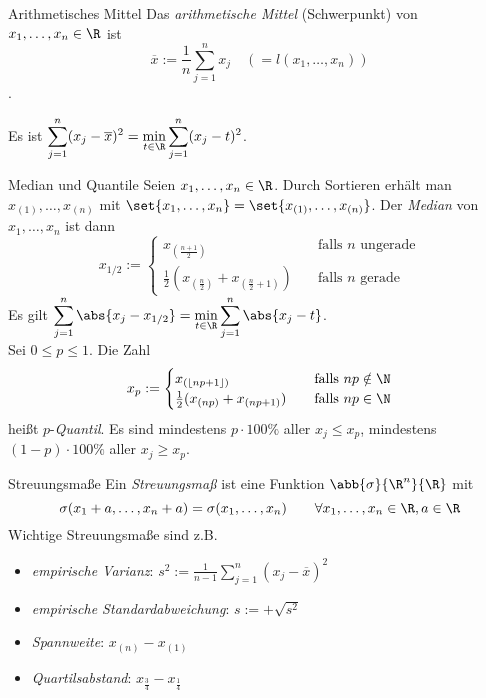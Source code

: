 \begin{karte}{Arithmetisches Mittel}
	Das \textit{arithmetische Mittel} (Schwerpunkt) von $x_1,\dotsc,x_n \in \R$ ist \[ \overline{x} := \frac{1}{n}\sum_{j=1}^{n} x_j \quad (= l(x_1,\dotsc,x_n))\].
	
	Es ist $\displaystyle \sum_{j=1}^{n} (x_j-\overline{x})^2 = 
	\min_{t \in \R} \sum_{j=1}^{n} (x_j-t)^2$.
\end{karte}
\begin{karte}{Median und Quantile}
	Seien $x_1,\dotsc,x_n \in \R$. Durch Sortieren erhält man $ x_{(1)},\dotsc,x_{(n)}$ mit $\set{x_1,\dotsc,x_n} = \set{x_{(1)},\dotsc,x_{(n)}}$. Der \textit{Median} von $x_1,\dotsc,x_n$ ist dann
	\[x_{1/2}:= \begin{cases}
	x_{(\frac{n+1}{2})} & \quad \text{falls } n \text{ ungerade} \\
	\frac{1}{2}(x_{(\frac{n}{2})}+x_{(\frac{n}{2}+1)}) & \quad \text{falls } n \text{ gerade}
	\end{cases}\]
	Es gilt $\displaystyle \sum_{j=1}^{n} \abs{x_j - x_{1/2}} = \min_{t \in \R} \sum_{j=1}^{n} \abs{x_j-t}$. \\
	Sei $0 \le p \le 1$. Die Zahl
	\[x_p:= \begin{cases}
	x_{(\lfloor np+1 \rfloor)} & \quad \text{falls } np \notin \N \\
	\frac{1}{2}(x_{(np)}+x_{(np+1)}) & \quad \text{falls } np \in \N
	\end{cases}\] heißt $p$-\textit{Quantil}. Es sind mindestens $p\cdot 100 \% $ aller $x_j \leq x_p$, mindestens $(1-p)\cdot 100 \%$ aller $x_j \geq x_p$.
\end{karte}

\begin{karte}{Streuungsmaße}
	Ein \textit{Streuungsmaß} ist eine Funktion $\abb{\sigma}{\R^n}{\R}$ mit \[\sigma(x_1+a,\dotsc,x_n+a) = \sigma(x_1,\dotsc,x_n) \qquad \forall x_1,\dotsc,x_n \in \R, a \in \R\]
	Wichtige Streuungsmaße sind z.B.
	\begin{itemize}
		\item \textit{empirische Varianz}: $\displaystyle s^2:=\frac{1}{n-1} \sum_{j=1}^{n} (x_j-\overline{x})^2$
		\item \textit{empirische Standardabweichung}: $s :=+\sqrt{s^2}$
		\item \textit{Spannweite}: $x_{(n)}-x_{(1)}$
		\item \textit{Quartilsabstand}: $x_{\frac{3}{4}}-x_{\frac{1}{4}}$
	\end{itemize}
\end{karte}

